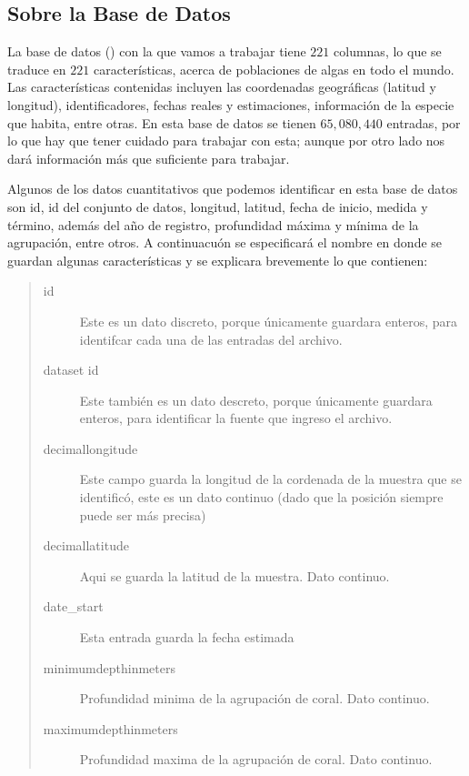 \documentclass[12pt]{article}
\begin{document}
	\subsection{Sobre la Base de Datos}
	
		\par La base de datos (\cite{db}) con la que vamos a trabajar tiene $221$ columnas, lo que se traduce en $221$ características, acerca de poblaciones de algas en todo el mundo. Las características contenidas incluyen las coordenadas geográficas (latitud y longitud), identificadores, fechas reales y estimaciones, información de la especie que habita, entre otras. En esta base de datos se tienen $65,080,440$ entradas, por lo que hay que tener cuidado para trabajar con esta; aunque por otro lado nos dará información más que suficiente para trabajar.
		
        \par Algunos de los datos cuantitativos que podemos identificar en esta base de datos son id, id del conjunto de datos, longitud, latitud, fecha de inicio, medida y término, además del año de registro, profundidad máxima y mínima de la agrupación, entre otros. A continuacu\'on se especificar\'a el nombre en donde se guardan algunas caracter\'isticas y se explicara brevemente lo que contienen:
        \begin{quote}\begin{description}
			\item [id] Este es un dato discreto, porque \'unicamente guardara enteros, para identifcar cada una de las entradas del archivo.
			\item [dataset id] Este tambi\'en es un dato descreto, porque \'unicamente guardara enteros, para identificar la fuente que ingreso el archivo.
			\item [decimallongitude] Este campo guarda la longitud de la cordenada de la muestra que se identific\'o, este es un dato continuo (dado que la posici\'on siempre puede ser m\'as precisa) 
			\item [decimallatitude] Aqui se guarda la latitud de la muestra. Dato continuo.
			\item [date\_start] Esta entrada guarda la fecha estimada 
			\item [minimumdepthinmeters] Profundidad minima de la agrupaci\'on de coral. Dato continuo.
			\item [maximumdepthinmeters] Profundidad maxima de la agrupaci\'on de coral. Dato continuo.
		\end{description}\end{quote}
		
\end{document}
